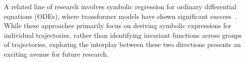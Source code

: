 {
A related line of research involves symbolic regression for ordinary differential equations (ODEs), where transformer models have shown significant success~\citep{becker2023predicting,d2023odeformer,seifner2024foundationalinferencemodelsdynamical}. While these approaches primarily focus on deriving symbolic expressions for individual trajectories, rather than identifying invariant functions across groups of trajectories, exploring the interplay between these two directions presents an exciting avenue for future research.}

\vspace{-0.2cm}